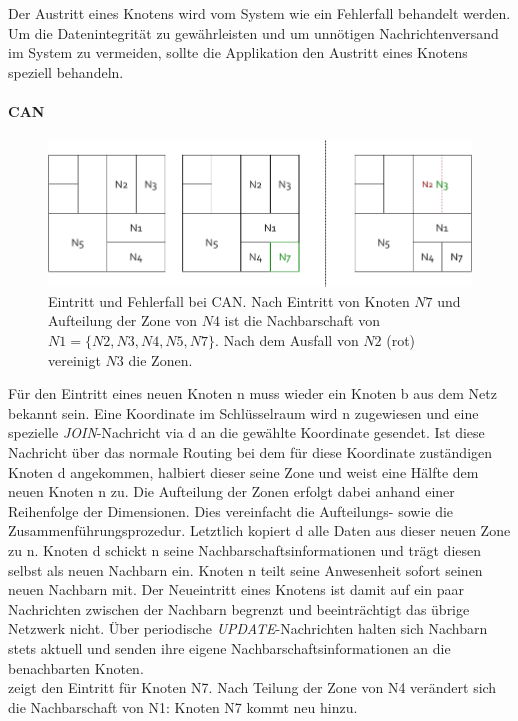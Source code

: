 Der Austritt eines Knotens wird vom System wie ein Fehlerfall behandelt werden. Um die Datenintegrität zu gewährleisten und um unnötigen Nachrichtenversand im System zu vermeiden, sollte die Applikation den Austritt eines Knotens speziell behandeln.

\paragraph{CAN}
\begin{figure}[htbp]
\centering
\includegraphics{grafics/can_new_node.pdf}
\caption{Eintritt und Fehlerfall bei CAN. Nach Eintritt von Knoten $N7$ und Aufteilung der Zone von $N4$ ist die Nachbarschaft von $N1 = \{N2, N3, N4, N5, N7\}$. Nach dem Ausfall von $N2$ (rot) vereinigt $N3$ die Zonen.}
\label{fig:can_new_node}
\end{figure}

Für den Eintritt eines neuen Knoten n muss wieder ein Knoten b aus dem Netz bekannt sein. Eine Koordinate im Schlüsselraum wird n zugewiesen und eine spezielle \emph{JOIN}-Nachricht via d an die gewählte Koordinate gesendet. Ist diese Nachricht über das normale Routing bei dem für diese Koordinate zuständigen Knoten d angekommen, halbiert dieser seine Zone und weist eine Hälfte dem neuen Knoten n zu. Die Aufteilung der Zonen erfolgt dabei anhand einer Reihenfolge der Dimensionen. Dies vereinfacht die Aufteilungs- sowie die Zusammenführungsprozedur. Letztlich kopiert d alle Daten aus dieser neuen Zone zu n. Knoten d schickt n seine Nachbarschaftsinformationen und trägt diesen selbst als neuen Nachbarn ein. Knoten n teilt seine Anwesenheit sofort seinen neuen Nachbarn mit. Der Neueintritt eines Knotens ist damit auf ein paar Nachrichten zwischen der Nachbarn begrenzt und beeinträchtigt das übrige Netzwerk nicht. Über periodische \emph{UPDATE}-Nachrichten halten sich Nachbarn stets aktuell und senden ihre eigene Nachbarschaftsinformationen an die benachbarten Knoten.\\
 zeigt den Eintritt für Knoten N7. Nach Teilung der Zone von N4 verändert sich die Nachbarschaft von N1: Knoten N7 kommt neu hinzu.

